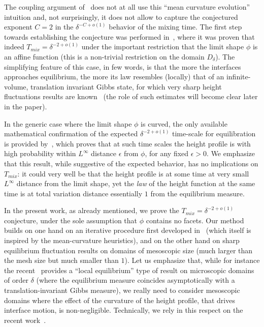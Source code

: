 \documentclass[10pt]{amsart}
\theoremstyle{definition}\newtheorem{defi}[theo]{Definition}\newtheorem{rema}[theo]{Remark}\newtheorem{exam}[theo]{Example}\newtheorem{exem}[theo]{Example}\newtheorem{nota}[theo]{Notation}
\begin{document}
The coupling argument of~\cite{LRS} does not at all use this ``mean curvature evolution'' intuition and, not surprisingly, it does not allow to capture the conjectured exponent $C=2$ in the $\delta^{-C+o(1)}$ behavior of the mixing time. The first step towards establishing the conjecture was performed in~\cite{CMT}, where it was proven that indeed $T_{mix}=\delta^{-2+o(1)}$ under the important restriction that the limit shape $\phi$ is an affine function (this is a non-trivial restriction on the domain $D_\delta$). The simplifying feature of this case, in few words, is that the more the interfaces approaches equilibrium, the more its law resembles (locally) that of an infinite-volume, translation invariant Gibbs state, for which very sharp height fluctuations results are known~\cite{Kenyon-lectures} (the role of such estimates will become clear later in the paper).

In the generic case where the limit shape $\phi$ is curved, the only available mathematical confirmation of the expected $\delta^{-2+o(1)}$ time-scale for equilibration is provided by~\cite{LT_cmp}, which proves that at such time scales the height profile is with high probability within $L^\infty$ distance $\epsilon$ from $\phi$, for any fixed $\epsilon>0$. We emphasize that this result, while suggestive of the expected behavior, has no implications on $T_{mix}$: it could very well be that the height profile is at some time at very small $L^\infty$ distance from the limit shape, yet the \emph{law} of the height function at the same time is at total variation distance essentially $1$ from the equilibrium measure.

In the present work, as already mentioned, we prove the $T_{mix}=\delta^{-2+o(1)}$ conjecture, under the sole assumption that $\phi$ contains no facets. Our method builds on one hand on an iterative procedure first developed in~\cite{CMT} (which itself is inspired by the mean-curvature heuristics), and on the other hand on sharp equilibrium fluctuation results on domains of mesoscopic size (much larger than the mesh size but much smaller than $1$). Let us emphasize that, while for instance the recent~\cite{Aggarwal} provides a ``local equilibrium'' type of result on microscopic domains of order $\delta$ (where the equilibrium measure coincides asymptotically with a translation-invariant Gibbs measure), we really need to consider mesoscopic domains where the effect of the curvature of the height profile, that drives interface motion, is non-negligible. Technically, we rely in this respect on the recent work~\cite{L_arxiv}.
\end{document}
